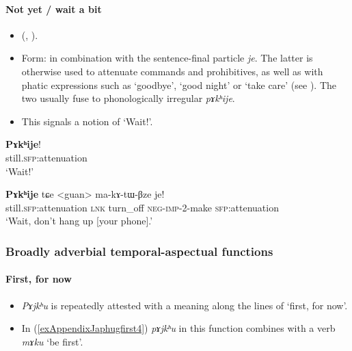 \paragraph{Not yet / wait a bit}\label{appendixJaphugNotYet}
\begin{itemize}
	\item \citeauthor{Jacques2016} (\citeyear[219]{Jacques2016}, \citeyear[1200–1201]{Jacques2021}).
	\item Form: in combination with the sentence-final particle \textit{je}. The latter is otherwise used to attenuate commands and prohibitives, as well as with phatic expressions such as \lq goodbye', \lq good night' or \lq take care' (see \cite[458–459]{Jacques2021}). The two usually fuse to phonologically irregular \textit{pɤkʰije}.
	\item This signals a notion of \lq Wait!\rq{}.
\end{itemize}

\begin{exe}
	\ex \gll \textbf{Pɤkʰije}!\\
	still.\textsc{sfp}:attenuation\\
	\glt \lq Wait!' \parencite[453]{Jacques2021}
	
	\ex
	\gll \textbf{Pɤkʰije} tɕe <guan> ma-kɤ-tɯ-βze je!\\
	still.\textsc{sfp}:attenuation \textsc{lnk} turn\_off \textsc{neg}-\textsc{imp}-2-make \textsc{sfp}:attenuation\\
	\glt \lq Wait, don’t hang up [your phone].' \parencite[458]{Jacques2021}
\end{exe}

\subsubsection{Broadly adverbial temporal-aspectual functions}
\paragraph{First, for now}\label{appendixJaphugFirst}
\begin{itemize}
	\item \textit{Pɤjkʰu} is repeatedly attested with a meaning along the lines of \lq first, for now'.
	\item In (\ref{exAppendixJaphugfirst4}) \textit{pɤjkʰu} in this function combines with a verb \textit{mɤku} \lq be first'.
\end{itemize}

